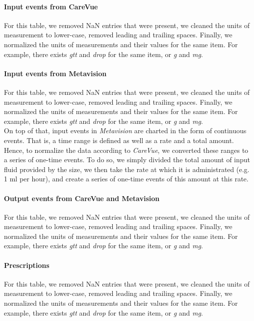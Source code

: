\paragraph{Input events from CareVue} For this table, we removed NaN entries that were present, we cleaned the units of measurement to lower-case, removed leading and trailing spaces. Finally, we normalized the units of measurements and their values for the same item. For example, there exists \textit{gtt} and \textit{drop} for the same item, or \textit{g} and \textit{mg}.

\paragraph{Input events from Metavision} For this table, we removed NaN entries that were present, we cleaned the units of measurement to lower-case, removed leading and trailing spaces. Finally, we normalized the units of measurements and their values for the same item. For example, there exists \textit{gtt} and \textit{drop} for the same item, or \textit{g} and \textit{mg}. \\

On top of that, input events in \textit{Metavision} are charted in the form of continuous events. That is, a time range is defined as well as a rate and a total amount. Hence, to normalize the data according to \textit{CareVue}, we converted these ranges to a series of one-time events. To do so, we simply divided the total amount of input fluid provided by the size, we then take the rate at which it is administrated (e.g. 1 ml per hour), and create a series of one-time events of this amount at this rate.

\paragraph{Output events from CareVue and Metavision} For this table, we removed NaN entries that were present, we cleaned the units of measurement to lower-case, removed leading and trailing spaces. Finally, we normalized the units of measurements and their values for the same item. For example, there exists \textit{gtt} and \textit{drop} for the same item, or \textit{g} and \textit{mg}.

\paragraph{Prescriptions} For this table, we removed NaN entries that were present, we cleaned the units of measurement to lower-case, removed leading and trailing spaces. Finally, we normalized the units of measurements and their values for the same item. For example, there exists \textit{gtt} and \textit{drop} for the same item, or \textit{g} and \textit{mg}. \\

